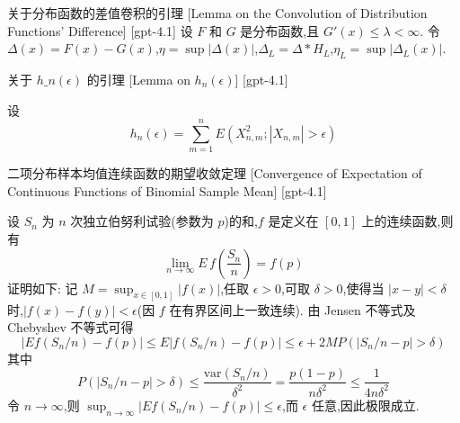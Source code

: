 \documentclass[UTF8]{ctexart}
\begin{document}
    
    
    \begin{lma}
        {关于分布函数的差值卷积的引理}
        [Lemma on the Convolution of Distribution Functions' Difference]
        [gpt-4.1]
        设 $F$ 和 $G$ 是分布函数,且 $G'(x) \leq \lambda < \infty$.
令 $\Delta(x) = F(x) - G(x)$,$\eta = \operatorname{sup} |\Delta(x)|$,$\Delta_{L} = \Delta * H_{L}$,$\eta_{L} = \operatorname{sup} |\Delta_{L}(x)|$.

    \end{lma}
    
    
    
    \begin{lma}
        {关于 $h\_n(\epsilon)$ 的引理}
        [Lemma on $h_n(\epsilon)$]
        [gpt-4.1]
        
设
\[
h _ { n } ( \epsilon ) = \sum _ { m = 1 } ^ { n } E ( X _ { n , m } ^ { 2 } ; | X _ { n , m } | > \epsilon )
\]

    \end{lma}
    
    
    
    \begin{thm}
        {二项分布样本均值连续函数的期望收敛定理}
        [Convergence of Expectation of Continuous Functions of Binomial Sample Mean]
        [gpt-4.1]
        
设 $S_n$ 为 $n$ 次独立伯努利试验(参数为 $p$)的和,$f$ 是定义在 $[0,1]$ 上的连续函数,则有
\[
\lim_{n \to \infty} E\, f \left( \frac{S_n}{n} \right) = f(p)
\]
证明如下:  
记 $M = \operatorname* { sup } _ { x \in [ 0 , 1 ] } | f ( x ) |$,任取 $\epsilon > 0$,可取 $\delta > 0$,使得当 $| x - y | < \delta$ 时,$| f ( x ) - f ( y ) | < \epsilon$(因 $f$ 在有界区间上一致连续).  
由 Jensen 不等式及 Chebyshev 不等式可得
\[
| E f ( S _ { n } / n ) - f ( p ) | \leq E | f ( S _ { n } / n ) - f ( p ) | \leq \epsilon + 2 M P ( | S _ { n } / n - p | > \delta )
\]
其中
\[
P ( | S _ { n } / n - p | > \delta ) \leq \frac { \mathrm { var } ( S _ { n } / n ) } { \delta ^ { 2 } } = \frac { p ( 1 - p ) } { n \delta ^ { 2 } } \leq \frac { 1 } { 4 n \delta ^ { 2 } }
\]
令 $n \to \infty$,则 $\operatorname*{sup}_{n \to \infty} | E f ( S _ { n } / n ) - f ( p ) | \le \epsilon$,而 $\epsilon$ 任意,因此极限成立.

    \end{thm}
    
\end{document}
